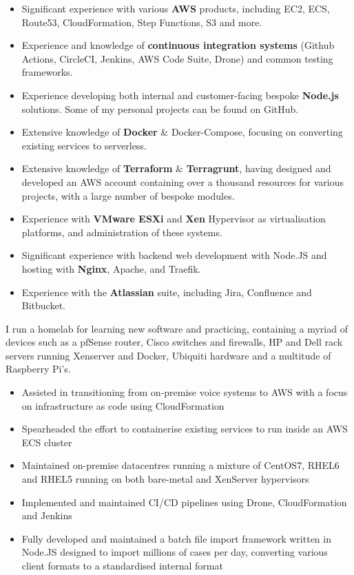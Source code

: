 \documentclass[10pt,a4paper,ragged2e]{altacv}
\begin{document}
\begin{itemize}
    \item Significant experience with various {\bf AWS} products, including EC2, ECS, Route53, CloudFormation, Step Functions, S3 and more. 
    \item Experience and knowledge of {\bf continuous integration systems} (Github Actions, CircleCI, Jenkins, AWS Code Suite, Drone) and common testing frameworks. 
    \item Experience developing both internal and customer-facing bespoke {\bf Node.js} solutions. Some of my personal projects can be found on GitHub.
    \item Extensive knowledge of {\bf Docker} \& Docker-Compose, focusing on converting existing services to serverless.
    \item Extensive knowledge of {\bf Terraform} \& {\bf Terragrunt}, having designed and developed an AWS account containing over a thousand resources for various projects, with a large number of bespoke modules.
    \item Experience with {\bf VMware ESXi} and {\bf Xen} Hypervisor as virtualisation platforms, and administration of these systems. 
    \item Significant experience with backend web development with Node.JS and hosting with {\bf Nginx}, Apache, and Traefik. 
    \item Experience with the {\bf Atlassian} suite, including Jira, Confluence and Bitbucket.
\end{itemize}
\clearpage

I run a homelab for learning new software and practicing, containing a myriad of devices such as a pfSense router, Cisco switches and firewalls, HP and Dell rack servers running Xenserver and Docker, Ubiquiti hardware and a multitude of Raspberry Pi's.

\smallskip



\begin{itemize}
\item Assisted in transitioning from on-premise voice systems to AWS with a focus on infrastructure as code using CloudFormation 
\item Spearheaded the effort to containerise existing services to run inside an AWS ECS cluster
\item Maintained on-premise datacentres running a mixture of CentOS7, RHEL6 and RHEL5 running on both bare-metal and XenServer hypervisors
\item Implemented and maintained CI/CD pipelines using Drone, CloudFormation and Jenkins
\item Fully developed and maintained a batch file import framework written in Node.JS designed to import millions of cases per day, converting various client formats to a standardised internal format
\end{itemize}
\end{document}
